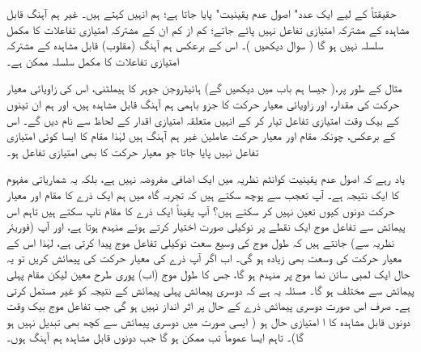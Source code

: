 حقیقتاً      کے لیے ایک عدد"  اصول عدم یقینیت"  پایا جاتا ہے؛ ہم انہیں  کہتے ہیں۔ غیر ہم آہنگ قابل مشاہدہ کے مشترکہ امتیازی تفاعل نہیں پائے جاتے؛  کم از کم ان کے مشترکہ امتیازی تفاعلات  کا مکمل  سلسلہ نہیں ہو گا ( سوال     دیکھیں )۔ اس کے برعکس ہم آہنگ (مقلوب)  قابل مشاہدہ  کے  مشترکہ امتیازی تفاعلات کا مکمل سلسلہ ممکن ہے۔


مثال کے طور پر،(  جیسا ہم باب   میں دیکھیں گے)   ہائیڈروجن جوہر کا ہیملٹنی،  اس کی زاویائی معیار حرکت کی مقدار،  اور زاویائی معیار حرکت کا  جزو  باہمی ہم آہنگ قابل مشاہدہ ہیں،  اور ہم ان تینوں کے بیک وقت امتیازی تفاعل تیار کر  کے  انہیں متعلقہ امتیازی اقدار کے لحاظ سے نام دیں گے۔ اس کے برعکس، چونکہ مقام اور معیار حرکت   عاملین غیر ہم آہنگ ہیں لہٰذا  مقام کا ایسا کوئی امتیازی تفاعل نہیں پایا جاتا جو معیار حرکت کا بھی امتیازی تفاعل ہو۔

 یاد رہے کہ اصول  عدم یقینیت   کوانٹم نظریہ میں ایک اضافی مفروضہ نہیں ہے،  بلکہ یہ شماریاتی مفہوم کا ایک نتیجہ ہے۔ آپ تعجب  سے پوچھ سکتے ہیں کہ تجربہ گاہ میں ہم ایک ذرے کا مقام اور معیار حرکت دونوں  کیوں تعین نہیں کر سکتے ہیں؟  آپ یقیناً ایک ذرے کا مقام  ناپ سکتے ہیں تاہم اس   پیمائش سے تفاعل موج ایک نقطے پر نوکیلی صورت اختیار کرتے ہوئے  منہدم  ہوتا  ہے،  اور آپ (فوریئر نظریہ سے)  جانتے ہیں کہ طول موج کی وسیع سعت نوکیلی تفاعل موج پیدا کرتی ہے،  لہٰذا اس کے  معیار حرکت کی وسعت بھی زیادہ ہو گی۔ اب اگر آپ ذرے کی  معیار حرکت کی پیمائش کریں تو  یہ حال  ایک لمبی سائن  نما موج پر منہدم ہو گا،  جس کا  طول موج (اب)   پوری طرح معین  لیکن    مقام پہلی پیمائش سے مختلف ہو گا۔  مسئلہ یہ ہے کہ دوسری پیمائش پہلی پیمائش کے نتیجہ کو  غیر مستمل کرتی ہے۔ صرف اس صورت  دوسری پیمائش ذرے  کے حال پر اثر انداز نہیں ہو گی  جب تفاعل موج بیک وقت دونوں قابل مشاہدہ  کا ا امتیازی حال ہو ( ایسی صورت میں دوسری پیمائش سے کچھ بھی تبدیل نہیں ہو گا)۔ تاہم  ایسا عموماً تب ممکن ہو گا جب  دونوں قابل مشاہدہ ہم آہنگ ہوں۔
 
